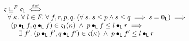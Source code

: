 \begin{definition}
%
\[
\begin{array}{l}
%		
		
	\amod{} \weakenI{F}  \amod{1} \iffdef \\
	\hspace*{0.2cm}\for{\ca{}} \for{l \in F}  \for{f, r, p, q} (\for{s} s \leq p \land s \leq q \implies s = \unitL) \implies\\
	\hspace*{0.2cm}
	\begin{array}{l}
		(p \composeL f, q \composeL f) \in \amod{1}(\ca{}) 
		\;\land\; p \composeL f \leq l \composeL r \implies \\
		\hspace*{0.4cm}\exsts{f'} (p \composeL f', q \composeL f') \in \amod{}(\ca{}) \;\land\; p \composeL f' \leq l \composeL r \\


\end{array}
\end{array}\]
\end{definition}
